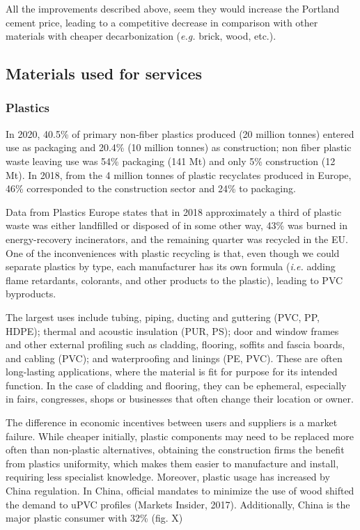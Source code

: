 All the improvements described above, seem they would increase the Portland cement price, leading to a competitive decrease in comparison with other materials with cheaper decarbonization (\textit{e.g.} brick, wood, etc.).

\subsection{Materials used for services}
\label{sec:materials_used_for_services}

\subsubsection{Plastics}
\label{sec:plastics}

In 2020, 40.5\% of primary non-fiber plastics produced (20 million tonnes) entered use as packaging and 20.4\% (10 million tonnes) as construction;\autocite{plasticseurpo_2021} non fiber plastic waste leaving use was 54\% packaging (141 Mt) and only 5\% construction (12 Mt).\autocite{geyer2017production} In 2018, from the 4 million tonnes of plastic recyclates produced in Europe, 46\% corresponded to the construction sector and 24\% to packaging.\autocite{plasticseurpo_2021}

Data from Plastics Europe states that in 2018 approximately a third of plastic waste was either landfilled or disposed of in some other way, 43\% was burned in energy-recovery incinerators, and the remaining quarter was recycled in the EU.\autocite{asbp_2020} One of the inconveniences with plastic recycling is that, even though we could separate plastics by type, each manufacturer has its own formula (\textit{i.e.} adding flame retardants, colorants, and other products to the plastic), leading to PVC byproducts.\autocite{kommerling_2022}

The largest uses include tubing, piping, ducting and guttering (PVC, PP, HDPE); thermal and acoustic insulation (PUR, PS); door and window frames and other external profiling such as cladding, flooring, soffits and fascia boards, and cabling (PVC); and waterproofing and linings (PE, PVC). These are often long-lasting applications, where the material is fit for purpose for its intended function.\autocite{asbp_2020} In the case of cladding and flooring, they can be ephemeral, especially in fairs, congresses, shops or businesses that often change their location or owner.

The difference in economic incentives between users and suppliers is a market failure. While cheaper initially, plastic components may need to be replaced more often than non-plastic alternatives, obtaining the construction firms the benefit from plastics uniformity, which makes them easier to manufacture and install, requiring less specialist knowledge.\autocite{pickard2020phasing} Moreover, plastic usage has increased by China regulation. In China, official mandates to minimize the use of wood shifted the demand to uPVC profiles (Markets Insider, 2017). Additionally, China is the major plastic consumer with 32\% (fig. X) 

